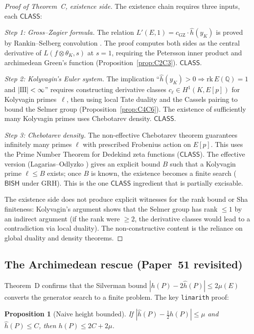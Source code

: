 \documentclass[11pt]{article}
\theoremstyle{plain}
\newtheorem{proposition}[theorem]{Proposition}
\theoremstyle{definition}
\theoremstyle{remark}
\newcommand{\Q}{\mathbb{Q}}
\newcommand{\Sha}{\text{\raisebox{0.05ex}{\scalebox{0.85}[1]{III}}}}
\newcommand{\rk}{\mathrm{rk}}
\newcommand{\BISH}{\ensuremath{\mathsf{BISH}}}
\newcommand{\CLASS}{\ensuremath{\mathsf{CLASS}}}
\newcommand{\hhat}{\hat{h}}
\begin{document}
\begin{proof}[Proof of Theorem~C, existence side]
The existence chain requires three inputs, each $\CLASS$:

\emph{Step 1: Gross--Zagier formula.} The relation $L'(E,1) = c_{\mathrm{GZ}} \cdot \hhat(y_K)$ is proved by Rankin--Selberg convolution \cite{gross-zagier}. The proof computes both sides as the central derivative of $L(f \otimes \theta_K, s)$ at $s = 1$, requiring the Petersson inner product and archimedean Green's function (Proposition~\ref{prop:C2C3}). $\CLASS$.

\emph{Step 2: Kolyvagin's Euler system.} The implication ``$\hhat(y_K) > 0 \Rightarrow \rk\, E(\Q) = 1$ and $|\Sha| < \infty$'' requires constructing derivative classes $c_\ell \in H^1(K, E[p])$ for Kolyvagin primes~$\ell$, then using local Tate duality and the Cassels pairing to bound the Selmer group (Proposition~\ref{prop:C4C6}). The existence of sufficiently many Kolyvagin primes uses Chebotarev density. $\CLASS$.

\emph{Step 3: Chebotarev density.} The non-effective Chebotarev theorem guarantees infinitely many primes $\ell$ with prescribed Frobenius action on $E[p]$. This uses the Prime Number Theorem for Dedekind zeta functions ($\CLASS$). The effective version (Lagarias--Odlyzko \cite{lagarias-odlyzko}) gives an explicit bound $B$ such that a Kolyvagin prime $\ell \leq B$ exists; once $B$ is known, the existence becomes a finite search ($\BISH$ under GRH). This is the one $\CLASS$ ingredient that is partially excisable.

The existence side does not produce explicit witnesses for the rank bound or Sha finiteness: Kolyvagin's argument shows that the Selmer group has rank $\leq 1$ by an indirect argument (if the rank were $\geq 2$, the derivative classes would lead to a contradiction via local duality). The non-constructive content is the reliance on global duality and density theorems.
\end{proof}

\subsection{The Archimedean rescue (Paper~51 revisited)}

Theorem~D confirms that the Silverman bound $|h(P) - 2\hhat(P)| \leq 2\mu(E)$ converts the generator search to a finite problem. The key \texttt{linarith} proof:

\begin{proposition}[Naive height bounded]\label{prop:height-bound}
If $|\hhat(P) - \tfrac{1}{2}h(P)| \leq \mu$ and $\hhat(P) \leq C$, then $h(P) \leq 2C + 2\mu$.
\end{proposition}
\end{document}
